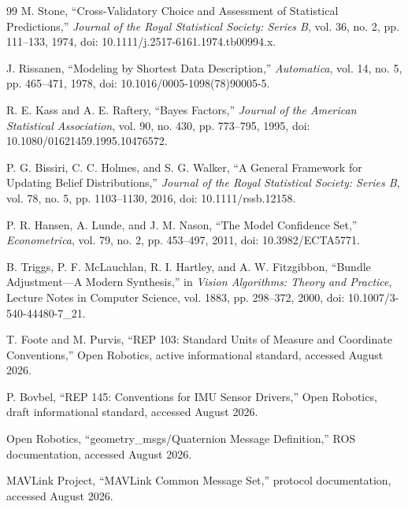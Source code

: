 \documentclass[11pt]{article}
\begin{document}
\begin{thebibliography}{99}
        M. Stone,
        ``Cross-Validatory Choice and Assessment of Statistical Predictions,''
        \emph{Journal of the Royal Statistical Society: Series B},
        vol. 36, no. 2, pp. 111--133, 1974,
        doi: 10.1111/j.2517-6161.1974.tb00994.x.

        J. Rissanen,
        ``Modeling by Shortest Data Description,''
        \emph{Automatica}, vol. 14, no. 5, pp. 465--471, 1978,
        doi: 10.1016/0005-1098(78)90005-5.

        R. E. Kass and A. E. Raftery,
        ``Bayes Factors,''
        \emph{Journal of the American Statistical Association},
        vol. 90, no. 430, pp. 773--795, 1995,
        doi: 10.1080/01621459.1995.10476572.

        P. G. Bissiri, C. C. Holmes, and S. G. Walker,
        ``A General Framework for Updating Belief Distributions,''
        \emph{Journal of the Royal Statistical Society: Series B},
        vol. 78, no. 5, pp. 1103--1130, 2016,
        doi: 10.1111/rssb.12158.

        P. R. Hansen, A. Lunde, and J. M. Nason,
        ``The Model Confidence Set,''
        \emph{Econometrica}, vol. 79, no. 2, pp. 453--497, 2011,
        doi: 10.3982/ECTA5771.

        B. Triggs, P. F. McLauchlan, R. I. Hartley, and A. W. Fitzgibbon,
        ``Bundle Adjustment---A Modern Synthesis,'' in \emph{Vision Algorithms: Theory and
        Practice}, Lecture Notes in Computer Science, vol. 1883, pp. 298--372, 2000,
        doi: 10.1007/3-540-44480-7\_21.

        T. Foote and M. Purvis,
        ``REP 103: Standard Units of Measure and Coordinate Conventions,''
        Open Robotics, active informational standard, accessed August 2026.

        P. Bovbel,
        ``REP 145: Conventions for IMU Sensor Drivers,''
        Open Robotics, draft informational standard, accessed August 2026.

        Open Robotics,
        ``geometry\_msgs/Quaternion Message Definition,''
        ROS documentation, accessed August 2026.

        MAVLink Project,
        ``MAVLink Common Message Set,''
        protocol documentation, accessed August 2026.


\end{thebibliography}
\end{document}
